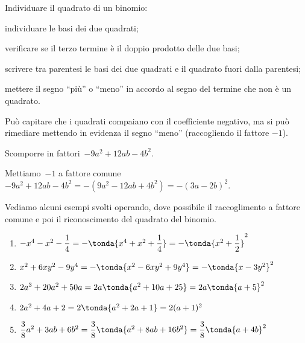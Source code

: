 \begin{procedura}
Individuare il quadrato di un binomio:
\begin{enumeratea}
\item individuare le basi dei due quadrati;
\item verificare se il terzo termine è il doppio prodotto delle due basi;
\item scrivere tra parentesi le basi dei due quadrati e il quadrato fuori 
 dalla parentesi;
\item mettere il segno ``più'' o ``meno'' in accordo al segno del termine che 
 non è un quadrato.
\end{enumeratea}
\end{procedura}

Può capitare che i quadrati compaiano con il coefficiente negativo, ma si può 
rimediare mettendo in evidenza il segno ``meno'' (raccogliendo il fattore 
\(-1\)).

 \begin{esempio}
Scomporre in fattori~\(-9a^{2}+12{ab}-4b^{2}\).

Mettiamo~\(-1\) a fattore comune
\(-9a^{2}+12ab-4b^{2}=-(9a^{2}-12{ab}+4b^{2})=-(3a-2b)^{2}\).
 \end{esempio}

 \begin{esempio}
Vediamo alcuni esempi svolti operando, dove possibile il raccoglimento a 
fattore comune e poi il riconoscimento del quadrato del binomio.

\begin{enumerate}
\item 
\(-x^4-x^2-\dfrac{1}{4}=-\tonda{x^4+x^2+\dfrac{1}{4}}=
  -\tonda{x^2+\dfrac{1}{2}}^{2}\)
\item 
\(x^2+6xy^{2}-9y^{4}=-\tonda{x^2-6xy^{2}+9y^{4}}=
  -\tonda{x-3y^{2}}^{2}\)
\item 
\(2a^{3}+20a^{2}+50a=2a\tonda{a^{2}+10a+25}=2a\tonda{a+5}^{2}\)
\item 
\(2a^{2}+4a+2=2\tonda{a^{2}+2a+1}=2(a+1)^{2}\)
\item 
\(\dfrac{3}{8}a^{2}+3ab+6b^{2}=
  \dfrac{3}{8}\tonda{a^{2}+8ab+16b^{2} }=
  \dfrac{3}{8}\tonda{a+4b}^{2}\)
\end{enumerate}
\end{esempio}


